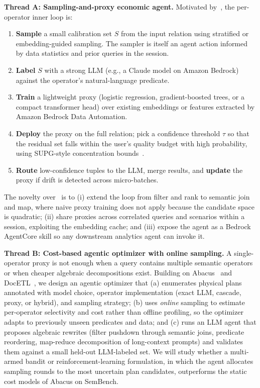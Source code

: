 \documentclass[11pt]{article}
\begin{document}
\noindent\textbf{Thread A: Sampling-and-proxy economic agent.}
Motivated by~\cite{chung2026proxy,kang2020supg}, the per-operator inner loop is:
\begin{enumerate}[leftmargin=1.3em,itemsep=1pt,topsep=1pt]
\item \textbf{Sample} a small calibration set $S$ from the input relation using stratified or embedding-guided sampling. The sampler is itself an agent action informed by data statistics and prior queries in the session.
\item \textbf{Label} $S$ with a strong LLM (e.g., a Claude model on Amazon Bedrock) against the operator's natural-language predicate.
\item \textbf{Train} a lightweight proxy (logistic regression, gradient-boosted trees, or a compact transformer head) over existing embeddings or features extracted by Amazon Bedrock Data Automation.
\item \textbf{Deploy} the proxy on the full relation; pick a confidence threshold $\tau$ so that the residual set falls within the user's quality budget with high probability, using SUPG-style concentration bounds~\cite{kang2020supg}.
\item \textbf{Route} low-confidence tuples to the LLM, merge results, and \textbf{update} the proxy if drift is detected across micro-batches.
\end{enumerate}
The novelty over~\cite{chung2026proxy} is to (i) extend the loop from filter and rank to semantic join and map, where naive proxy training does not apply because the candidate space is quadratic; (ii) share proxies across correlated queries and scenarios within a session, exploiting the embedding cache; and (iii) expose the agent as a Bedrock AgentCore skill so any downstream analytics agent can invoke it.

\noindent\textbf{Thread B: Cost-based agentic optimizer with online sampling.}
A single-operator proxy is not enough when a query contains multiple semantic operators or when cheaper algebraic decompositions exist. Building on Abacus~\cite{russo2025abacus} and DocETL~\cite{shankar2025docetl}, we design an agentic optimizer that (a) enumerates physical plans annotated with model choice, operator implementation (exact LLM, cascade, proxy, or hybrid), and sampling strategy; (b) uses \emph{online} sampling to estimate per-operator selectivity and cost rather than offline profiling, so the optimizer adapts to previously unseen predicates and data; and (c) runs an LLM agent that proposes algebraic rewrites (filter pushdown through semantic joins, predicate reordering, map-reduce decomposition of long-context prompts) and validates them against a small held-out LLM-labeled set. We will study whether a multi-armed bandit or reinforcement-learning formulation, in which the agent allocates sampling rounds to the most uncertain plan candidates, outperforms the static cost models of Abacus on SemBench.
\end{document}
